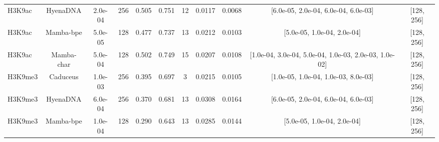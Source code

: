 \begin{landscape}
\begin{table}[]
\begin{tabular}{@{}lcccccccccc@{}}
H3K9ac & HyenaDNA & 2.0e-04 & 256 & 0.505 & 0.751 & 12 & 0.0117 & 0.0068 & [6.0e-05, 2.0e-04, 6.0e-04, 6.0e-03] & [128, 256] \\
H3K9ac & Mamba-bpe & 5.0e-05 & 128 & 0.477 & 0.737 & 13 & 0.0212 & 0.0103 & [5.0e-05, 1.0e-04, 2.0e-04] & [128, 256] \\
H3K9ac & Mamba-char & 5.0e-04 & 128 & 0.502 & 0.749 & 15 & 0.0207 & 0.0108 & [1.0e-04, 3.0e-04, 5.0e-04, 1.0e-03, 2.0e-03, 1.0e-02] & [128, 256] \\
H3K9me3 & Caduceus & 1.0e-03 & 256 & 0.395 & 0.697 & 3 & 0.0215 & 0.0105 & [1.0e-05, 1.0e-04, 1.0e-03, 8.0e-03] & [128, 256] \\
H3K9me3 & HyenaDNA & 6.0e-04 & 256 & 0.370 & 0.681 & 13 & 0.0308 & 0.0164 & [6.0e-05, 2.0e-04, 6.0e-04, 6.0e-03] & [128, 256] \\
H3K9me3 & Mamba-bpe & 1.0e-04 & 128 & 0.290 & 0.643 & 13 & 0.0285 & 0.0144 & [5.0e-05, 1.0e-04, 2.0e-04] & [128, 256] \\
\bottomrule
\end{tabular}
\end{table}
\end{landscape}

